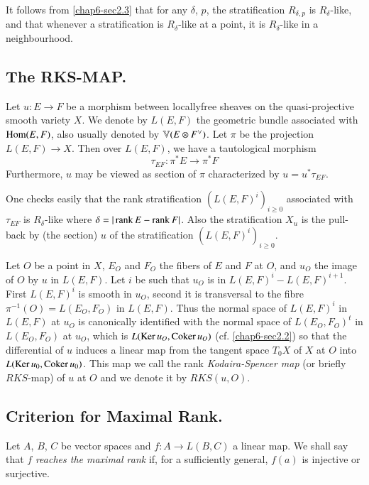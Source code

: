It follows from \ref{chap6-sec2.3} that for any $\delta$, $p$, the
stratification $R_{\delta,p}$ is $R_{\delta}$-like, and that whenever
a stratification is $R_{\delta}$-like at a point, it is
$R_{\delta}$-like in a neighbourhood.

\setcounter{subsection}{1}
\subsection{The RKS-MAP.}\label{chap6-sec3.2}

Let $u:E\to F$ be a morphism between locally\pageoriginale free
sheaves on the quasi-projective smooth variety $X$. We denote by
$L(E,F)$ the geometric bundle associated with $\operatorname{Hom}(E,F)$, also
usually denoted by $\mathbb{V}(E\otimes F\spcheck)$. Let $\pi$ be the
projection $L(E,F)\to X$. Then over $L(E,F)$, we have a tautological
morphism
$$
\tau_{EF}:\pi^{*}E\to \pi^{*}F
$$
Furthermore, $u$ may be viewed as section of $\pi$ characterized by
$u=u^{*}\tau_{EF}$. 

One checks easily that the rank stratification $(L(E,F)^{i})_{i\geq
0}$ associated with $\tau_{EF}$ is $R_{\delta}$-like where
$\delta=|\operatorname{rank} E-\operatorname{rank} F|$. Also the stratification $X_{u}$ is the
pull-back by (the section) $u$ of the stratification
$(L(E,F)^{i})_{i\geq 0}$. 

Let $O$ be a point in $X$, $E_{O}$ and $F_{O}$ the fibers of $E$ and
$F$ at $O$, and $u_{O}$ the image of $O$ by $u$ in $L(E,F)$. Let $i$
be such that $u_{O}$ is in $L(E,F)^{i}-L(E,F)^{i+1}$. First
$L(E,F)^{i}$ is smooth in $u_{O}$, second it is transversal to the
fibre $\pi^{-1}(O)=L(E_{O},F_{O})$ in $L(E,F)$. Thus the normal space
of $L(E,F)^{i}$ in $L(E,F)$ at $u_{O}$ is canonically identified with
the normal space of $L(E_{O},F_{O})^{t}$ in $L(E_{O},F_{O})$ at
$u_{O}$, which is $L(\operatorname{Ker} u_{O}, \operatorname{Coker} u_{O})$
(cf. \ref{chap6-sec2.2}) so that the differential of $u$ induces a
linear map from the tangent space $T_{0}X$ of $X$ at $O$ into $L(\operatorname{Ker}
u_{0},\operatorname{Coker} u_{0})$. This map we call the rank {\em Kodaira-Spencer
map} (or briefly $RKS$-map) of $u$ at $O$ and we denote it by
$RKS(u,O)$.

\subsection{Criterion for Maximal Rank.}\label{chap6-sec3.3}

Let $A$, $B$, $C$ be vector spaces and $f:A\to L(B,C)$ a linear
map. We shall say that $f$ {\em reaches the maximal rank} if, for a
sufficiently general, $f(a)$ is injective or surjective.


